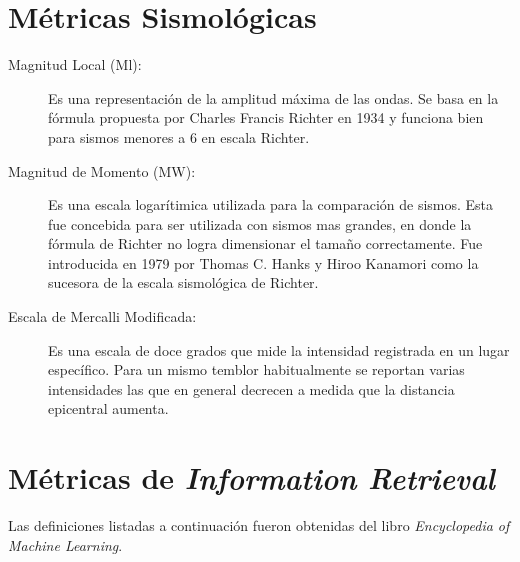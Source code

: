 \section{Métricas Sismológicas}
\label{sec:metricassis}
\begin{description}
\item[Magnitud Local (Ml):] Es una representación de la amplitud máxima de las ondas. Se basa en la fórmula propuesta por Charles Francis Richter en 1934 y funciona bien para sismos menores a 6 en escala Richter.\cite{csnglosary}

\item[Magnitud de Momento (MW):] Es una escala logarítimica utilizada para la comparación de sismos. Esta fue concebida para ser utilizada con sismos mas grandes, en donde la fórmula de Richter no logra dimensionar el tamaño correctamente. Fue introducida en 1979 por Thomas C. Hanks y Hiroo Kanamori como la sucesora de la escala sismológica de Richter.\cite{csnglosary}

\item[Escala de Mercalli Modificada:] Es una escala de doce grados que mide la intensidad registrada en un lugar específico. Para un mismo temblor habitualmente se reportan varias intensidades las que en general decrecen a medida que la distancia epicentral aumenta.\cite{csnglosary}
\end{description}

\section{Métricas de \textit{Information Retrieval}}
\label{sec:metricasir}

Las definiciones listadas a continuación fueron obtenidas del libro \textit{Encyclopedia of Machine Learning}\cite{encyclopediaml}.


